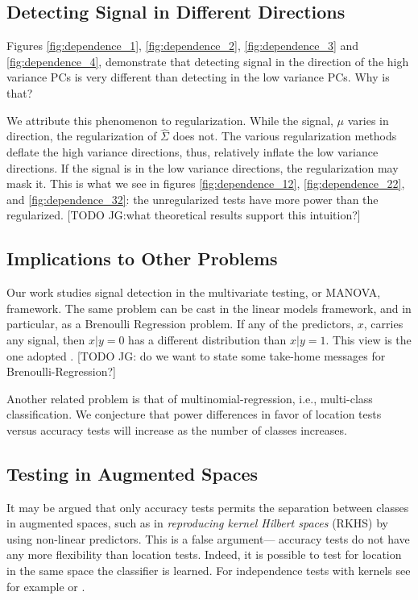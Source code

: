 \documentclass[12pt,a4paper]{article}
\begin{document}
\subsection{Detecting Signal in Different Directions}
Figures \ref{fig:dependence_1}, \ref{fig:dependence_2}, \ref{fig:dependence_3} and \ref{fig:dependence_4}, demonstrate that detecting signal in the direction of the high variance PCs is very different than detecting in the low variance PCs.
Why is that?

We attribute this phenomenon to regularization.
While the signal, $\mu$ varies in direction, the regularization of $\hat \Sigma$ does not. 
The various regularization methods deflate the high variance directions, thus, relatively inflate the low variance directions.
If the signal is in the low variance directions, the regularization may mask it. 
This is what we see in figures \ref{fig:dependence_12}, \ref{fig:dependence_22}, and \ref{fig:dependence_32}: the unregularized tests have more power than the regularized. 
[TODO JG:what theoretical results support this intuition?]



\subsection{Implications to Other Problems}

Our work studies signal detection in the multivariate testing, or MANOVA, framework.
The same problem can be cast in the linear models framework, and in particular, as a Brenoulli Regression problem.
If any of the predictors, $x$, carries any signal, then $x|y=0$ has a different distribution than $x|y=1$.
This view is the one adopted \cite{goeman2006testing}.
[TODO JG: do we want to state some take-home messages for Brenoulli-Regression?]

Another related problem is that of multinomial-regression, i.e., multi-class classification.
We conjecture that power differences in favor of location tests versus accuracy tests will increase as the number of classes increases.




\subsection{Testing in Augmented Spaces}
It may be argued that only accuracy tests permits the separation between classes in augmented spaces, such as in \emph{reproducing kernel Hilbert spaces} (RKHS) by using non-linear predictors. 
This is a false argument--- accuracy tests do not have any more flexibility than location tests. 
Indeed, it is possible to test for location in the same space the classifier is learned. 
For independence tests  with kernels see for example \cite{szekely_brownian_2009} or \citet{gretton_kernel_2012-1}.
\end{document}

